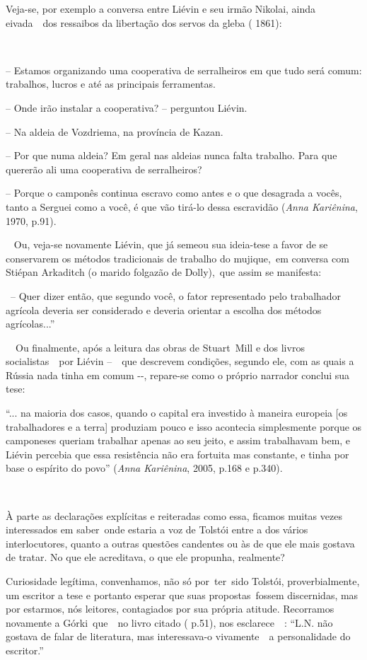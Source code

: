 Veja-se, por exemplo a conversa entre Liévin e seu irmão Nikolai, ainda
eivada~~dos ressaibos da libertação dos servos da gleba ( 1861):

~

-- Estamos organizando uma cooperativa de serralheiros em que tudo será
comum: trabalhos, lucros e até as principais ferramentas.

-- Onde irão instalar a cooperativa? -- perguntou Liévin.

-- Na aldeia de Vozdriema, na província de Kazan.

-- Por que numa aldeia? Em geral nas aldeias nunca falta trabalho. Para
que quererão ali uma cooperativa de serralheiros?

-- Porque o camponês continua escravo como antes e o que desagrada a
vocês, tanto a Serguei como a você, é que vão tirá-lo dessa escravidão
(\emph{Anna Kariênina}, 1970, p.91).

\emph{~} Ou, veja-se novamente Liévin, que já semeou sua ideia-tese a
favor de se conservarem os métodos tradicionais de trabalho do
mujique,~em conversa com Stiépan Arkaditch (o marido folgazão de
Dolly),~que assim se manifesta:

~-- Quer dizer então, que segundo você, o fator representado pelo
trabalhador agrícola deveria ser considerado e deveria orientar a
escolha dos métodos agrícolas...''

~~Ou finalmente, após a leitura das obras de Stuart~Mill e dos livros
socialistas~~por Liévin --~~que descrevem condições, segundo ele, com as
quais a Rússia nada tinha em comum -\/-, repare-se como o próprio
narrador conclui sua tese:

``... na maioria dos casos, quando o capital era investido à maneira
europeia {[}os trabalhadores e a terra{]} produziam pouco e isso
acontecia simplesmente porque os camponeses queriam trabalhar apenas ao
seu jeito, e assim trabalhavam bem, e Liévin percebia que essa
resistência não era fortuita mas constante, e tinha por base o espírito
do povo'' (\emph{Anna Kariênina}, 2005, p.168 e p.340).

~

À parte as declarações explícitas e reiteradas como essa, ficamos muitas
vezes interessados em saber~onde estaria a voz de Tolstói entre a dos
vários interlocutores, quanto a outras questões candentes ou às de que
ele mais gostava de tratar. No que ele acreditava, o que ele propunha,
realmente?

Curiosidade legítima, convenhamos, não só por~ter~sido Tolstói,
proverbialmente, um escritor a tese e portanto esperar que suas
propostas~fossem discernidas, mas por estarmos, nós leitores,
contagiados por sua própria atitude. Recorramos novamente a
Górki~que~~no livro citado ( p.51), nos esclarece~~: ``L.N. não gostava
de falar de literatura, mas interessava-o vivamente~~a personalidade do
escritor.''

